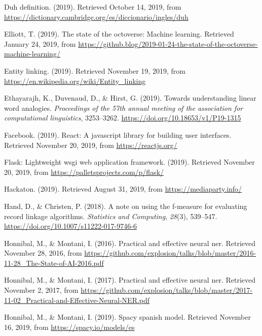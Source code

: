 \documentclass[12pt,a4paper,]{scrartcl}
\begin{document}
\leavevmode\hypertarget{ref-cambridge_duh}{}%
Duh definition. (2019). Retrieved October 14, 2019, from \url{https://dictionary.cambridge.org/es/diccionario/ingles/duh}

\leavevmode\hypertarget{ref-github_machine_learning}{}%
Elliott, T. (2019). The state of the octoverse: Machine learning. Retrieved January 24, 2019, from \url{https://github.blog/2019-01-24-the-state-of-the-octoverse-machine-learning/}

\leavevmode\hypertarget{ref-wiki_nel}{}%
Entity linking. (2019). Retrieved November 19, 2019, from \url{https://en.wikipedia.org/wiki/Entity_linking}

\leavevmode\hypertarget{ref-ethayarajh-etal-2019-towards}{}%
Ethayarajh, K., Duvenaud, D., \& Hirst, G. (2019). Towards understanding linear word analogies. \emph{Proceedings of the 57th annual meeting of the association for computational linguistics}, 3253--3262. \url{https://doi.org/10.18653/v1/P19-1315}

\leavevmode\hypertarget{ref-react}{}%
Facebook. (2019). React: A javascript library for building user interfaces. Retrieved November 20, 2019, from \url{https://reactjs.org/}

\leavevmode\hypertarget{ref-flask}{}%
Flask: Lightweight wsgi web application framework. (2019). Retrieved November 20, 2019, from \url{https://palletsprojects.com/p/flask/}

\leavevmode\hypertarget{ref-hackaton2019}{}%
Hackaton. (2019). Retrieved August 31, 2019, from \url{https://mediaparty.info/}

\leavevmode\hypertarget{ref-pub_1084928040}{}%
Hand, D., \& Christen, P. (2018). A note on using the f-measure for evaluating record linkage algorithms. \emph{Statistics and Computing}, \emph{28}(3), 539--547. \url{https://doi.org/10.1007/s11222-017-9746-6}

\leavevmode\hypertarget{ref-montani_AI}{}%
Honnibal, M., \& Montani, I. (2016). Practical and effective neural ner. Retrieved November 28, 2016, from \url{https://github.com/explosion/talks/blob/master/2016-11-28_The-State-of-AI-2016.pdf}

\leavevmode\hypertarget{ref-honnibal_NER}{}%
Honnibal, M., \& Montani, I. (2017). Practical and effective neural ner. Retrieved November 2, 2017, from \url{https://github.com/explosion/talks/blob/master/2017-11-02_Practical-and-Effective-Neural-NER.pdf}

\leavevmode\hypertarget{ref-spacy-spanish-model}{}%
Honnibal, M., \& Montani, I. (2019). Spacy spanish model. Retrieved November 16, 2019, from \url{https://spacy.io/models/es}
\end{document}

